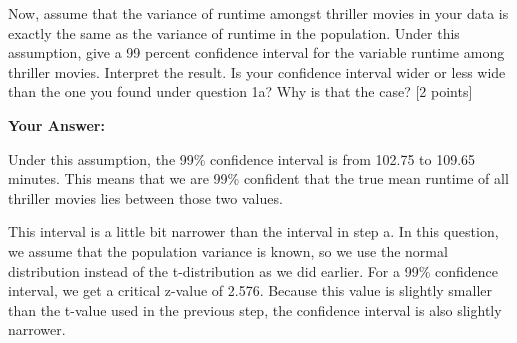 \documentclass[
]{article}
\newenvironment{Shaded}{\begin{snugshade}}{\end{snugshade}}
\newcommand{\CommentTok}[1]{\textcolor[rgb]{0.56,0.35,0.01}{\textit{#1}}}
\newcommand{\DocumentationTok}[1]{\textcolor[rgb]{0.56,0.35,0.01}{\textbf{\textit{#1}}}}
\newcommand{\FloatTok}[1]{\textcolor[rgb]{0.00,0.00,0.81}{#1}}
\newcommand{\FunctionTok}[1]{\textcolor[rgb]{0.13,0.29,0.53}{\textbf{#1}}}
\newcommand{\NormalTok}[1]{#1}
\newcommand{\OtherTok}[1]{\textcolor[rgb]{0.56,0.35,0.01}{#1}}
\newcommand{\SpecialCharTok}[1]{\textcolor[rgb]{0.81,0.36,0.00}{\textbf{#1}}}
\begin{document}
Now, assume that the variance of runtime amongst thriller movies in your
data is exactly the same as the variance of runtime in the population.
Under this assumption, give a 99 percent confidence interval for the
variable runtime among thriller movies. Interpret the result. Is your
confidence interval wider or less wide than the one you found under
question 1a? Why is that the case? {[}2 points{]}

\begin{Shaded}
\end{Shaded}

\textbf{Your Answer:}

Under this assumption, the 99\% confidence interval is from 102.75 to
109.65 minutes. This means that we are 99\% confident that the true mean
runtime of all thriller movies lies between those two values.

This interval is a little bit narrower than the interval in step a. In
this question, we assume that the population variance is known, so we
use the normal distribution instead of the t-distribution as we did
earlier. For a 99\% confidence interval, we get a critical z-value of
2.576. Because this value is slightly smaller than the t-value used in
the previous step, the confidence interval is also slightly narrower.
\end{document}
